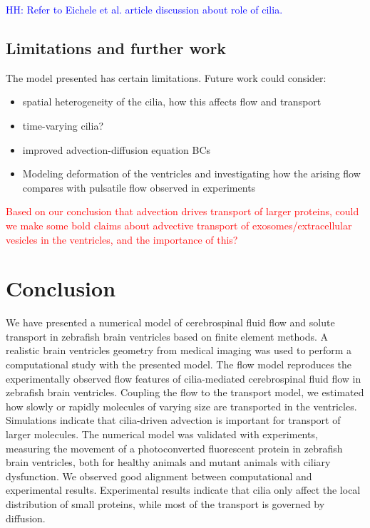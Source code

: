 \documentclass[fleqn]{wlscirep}
\newcommand{\lyng}[1]{\textcolor{blue}{#1}}
\newcommand{\fixme}[1]{\textcolor{red}{#1}}
\begin{document}
\lyng{HH: Refer to Eichele et al. article discussion about role of cilia.}

\subsection*{Limitations and further work}
The model presented has certain limitations. Future work could consider:
\begin{itemize}
    \item spatial heterogeneity of the cilia, how this affects flow and transport
    \item time-varying cilia?
    \item improved advection-diffusion equation BCs
    \item Modeling deformation of the ventricles
    and investigating how the arising flow compares with pulsatile flow observed in experiments
\end{itemize}

\fixme{Based on our conclusion that advection drives transport of larger proteins, could
we make some bold claims about advective transport of exosomes/extracellular vesicles in the
ventricles, and the importance of this?}

\section*{Conclusion}
We have presented a numerical model
of cerebrospinal fluid flow and solute transport in
zebrafish brain ventricles based on finite element methods.
A realistic brain ventricles geometry from medical imaging was used to perform a
computational study with the presented model. The flow model reproduces
the experimentally observed flow features of cilia-mediated cerebrospinal fluid
flow in zebrafish brain ventricles. Coupling the flow to the transport model,
we estimated how slowly or rapidly molecules of varying size are transported in
the ventricles. Simulations indicate that cilia-driven advection is important
for transport of larger molecules. 
The numerical model was validated with experiments, measuring the movement of
a photoconverted fluorescent protein in zebrafish brain ventricles,
both for healthy animals and mutant animals with ciliary dysfunction.
We observed good alignment between computational and experimental results.
Experimental results indicate that cilia only affect the local distribution of small proteins,
while most of the transport is governed by diffusion. 


\end{document}
